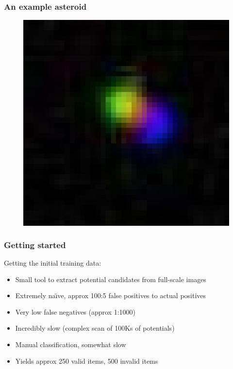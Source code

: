 \documentclass{beamer}
\begin{document}
\begin{frame}
    \frametitle{An example asteroid}
    \begin{figure}
        \centering
        \includegraphics[height=0.8\paperheight]{18364_large.jpg}
    \end{figure}
\end{frame}

\begin{frame}
    \frametitle{Getting started}
    Getting the initial training data:
    \begin{itemize}
        \item Small tool to extract potential candidates from full-scale images
        \item Extremely na\"{\i}ve, approx 100:5 false positives to actual positives
        \item Very low false negatives (approx 1:1000)
        \item Incredibly slow (complex scan of 100Ks of potentials)
        \item Manual classification, somewhat slow
        \item Yields approx 250 valid items, 500 invalid items
    \end{itemize}
\end{frame}

\end{document}
